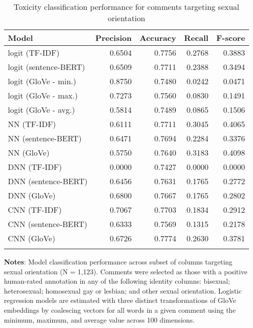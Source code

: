 \begin{table}[h]
	\caption{Toxicity classification performance for comments targeting sexual orientation \label{table:performance-sexual-orientation}}
    \centering
	\begin{tabular}{lrrrr}
		\toprule
			Model &  Precision &  Accuracy &  Recall &  F-score \\
		\midrule
			\addlinespace{}
			\parbox{7.5cm}{logit (TF-IDF)} &    0.6504 &    0.7756 &  0.2768 &   0.3883 \\
			\addlinespace{}
			logit (sentence-BERT) &     0.6509 &    0.7711 &  0.2388 &   0.3494 \\
			\addlinespace{}
			logit (GloVe - min.) &     0.8750 &    0.7480 &  0.0242 &   0.0471 \\
			\addlinespace{}
			logit (GloVe - max.) &     0.7273 &    0.7560 &  0.0830 &   0.1491 \\
			\addlinespace{}
			logit (GloVe - avg.) &     0.5814 &    0.7489 &  0.0865 &   0.1506 \\
			\addlinespace{}
			NN (TF-IDF) &     0.6111 &    0.7711 &  0.3045 &   0.4065 \\
			\addlinespace{}
			NN (sentence-BERT) &     0.6471 &    0.7694 &  0.2284 &   0.3376 \\
			\addlinespace{}
			NN (GloVe) &     0.5750 &    0.7640 &  0.3183 &   0.4098 \\
			\addlinespace{}
			DNN (TF-IDF) &     0.0000 &    0.7427 &  0.0000 &   0.0000 \\
			\addlinespace{}
			DNN (sentence-BERT) &     0.6456 &    0.7631 &  0.1765 &   0.2772 \\
			\addlinespace{}
			DNN (GloVe) &     0.6800 &    0.7667 &  0.1765 &   0.2802 \\
			\addlinespace{}
			CNN (TF-IDF) &      0.7067 &    0.7703 &  0.1834 &   0.2912 \\
			\addlinespace{}
			CNN (sentence-BERT)  &     0.6333 &    0.7569 &  0.1315 &   0.2178 \\
			\addlinespace{}
			CNN (GloVe)  &     0.6726 &    0.7774 &  0.2630 &   0.3781 \\
	\bottomrule
	\addlinespace[1em]
	\end{tabular}
	\parbox{14.5cm}{\textbf{Notes}: Model classification performance across subset of columns targeting sexual orientation (N = 1,123). Comments were selected as those with a positive human-rated annotation in any of the following identity columns: bisexual; heterosexual; homosexual gay or lesbian; and other sexual orientation. Logistic regression models are estimated with three distinct transformations of GloVe embeddings by coalescing vectors for all words in a given comment using the minimum, maximum, and average value across 100 dimensions.}
\end{table}


